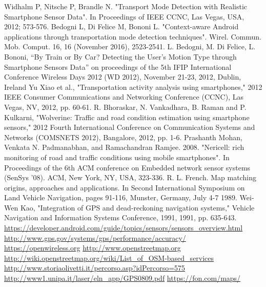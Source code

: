 \documentclass[12pt,a4paper,openright,twoside]{report}
\begin{document}
\begin{thebibliography}{90}             %
\rhead[\fancyplain{}{\bfseries \leftmark}]{\fancyplain{}{\bfseries
\thepage}}
 Widhalm P, Nitsche P, Brandle N. "Transport Mode Detection with Realistic Smartphone Sensor Data". In Proceedings of IEEE CCNC, Las Vegas, USA, 2012; 573-576.
 Bedogni L, Di Felice M, Bononi L. "Context-aware Android applications through transportation mode detection techniques". Wirel. Commun. Mob. Comput. 16, 16 (November 2016), 2523-2541.
 L. Bedogni, M. Di Felice, L. Bononi, “By Train or By Car? Detecting the User’s Motion Type through Smartphone Sensors Data” on proceedings of the 5th IFIP International Conference Wireless Days 2012 (WD 2012), November 21-23, 2012, Dublin, Ireland
 Yu Xiao et al., "Transportation activity analysis using smartphones," 2012 IEEE Consumer Communications and Networking Conference (CCNC), Las Vegas, NV, 2012, pp. 60-61.
 R. Bhoraskar, N. Vankadhara, B. Raman and P. Kulkarni, "Wolverine: Traffic and road condition estimation using smartphone sensors," 2012 Fourth International Conference on Communication Systems and Networks (COMSNETS 2012), Bangalore, 2012, pp. 1-6.
 Prashanth Mohan, Venkata N. Padmanabhan, and Ramachandran Ramjee. 2008. "Nericell: rich monitoring of road and traffic conditions using mobile smartphones". In Proceedings of the 6th ACM conference on Embedded network sensor systems (SenSys '08). ACM, New York, NY, USA, 323-336.
 R. L. French. Map matching origins, approaches and applications. In Second International Symposium on Land Vehicle Navigation, pages 91-116,
Munster, Germany, July 4-7 1989.
 Wei-Wen Kao, "Integration of GPS and dead-reckoning navigation systems," Vehicle Navigation and Information Systems Conference, 1991, 1991, pp. 635-643.
 \url{https://developer.android.com/guide/topics/sensors/sensors_overview.html}
 \url{http://www.gps.gov/systems/gps/performance/accuracy/}
 \url{https://openwireless.org}
 \url{http://www.openstreetmap.org}
 \url{http://wiki.openstreetmap.org/wiki/List_of_OSM-based_services}
 \url{http://www.storiaolivetti.it/percorso.asp?idPercorso=575}
 \url{http://www1.unipa.it/laser/eln_app/GPS0809.pdf}
 \url{https://fon.com/maps/}

\end{thebibliography}
\end{document}

